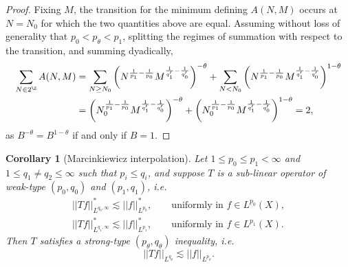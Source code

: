 \documentclass[reqno]{amsart}
\newtheorem{corollary}[theorem]{Corollary}
\theoremstyle{definition}
\theoremstyle{remark}
\begin{document}
\begin{proof}
	Fixing $M$, the transition for the minimum defining $A(N, M)$ occurs at $N = N_0$ for which the two quantities above are equal. Assuming without loss of generality that $p_0 < p_\theta < p_1$, splitting the regimes of summation with respect to the transition, and summing dyadically,
		\begin{align*}
			\sum_{N \in 2^\Z} A(N, M) 
				&= \sum_{N \geq N_0} \left( N^{\frac{1}{p_1} - \frac{1}{p_0}} M^{\frac{1}{q_1'} - \frac{1}{q_0'}} \right)^{-\theta} + \sum_{N < N_0}  \left( N^{\frac{1}{p_1} - \frac{1}{p_0}} M^{\frac{1}{q_1'} - \frac{1}{q_0'}} \right)^{1-\theta} \\
				&=  \left( N_0^{\frac{1}{p_1} - \frac{1}{p_0}} M^{\frac{1}{q_1'} - \frac{1}{q_0'}} \right)^{-\theta} +  \left( N_0^{\frac{1}{p_1} - \frac{1}{p_0}} M^{\frac{1}{q_1'} - \frac{1}{q_0'}} \right)^{1-\theta} = 2,
		\end{align*}	
	as $B^{-\theta} = B^{1 - \theta}$ if and only if $B = 1$. 	
\end{proof}

\begin{corollary}[Marcinkiewicz interpolation]
	Let $1 \leq p_0 \leq p_1 < \infty$ and $1 \leq q_1 \neq q_2 \leq \infty$ such that $p_i \leq q_i$, and suppose $T$ is a sub-linear operator of weak-type $(p_0, q_0)$ and $(p_1, q_1)$, i.e.
		\begin{align*}
			||Tf||_{L^{q_0, \infty}}^* \lesssim ||f||_{L^{p_0}}^*, \qquad \text{uniformly in $f \in L^{p_0}(X)$}, \\
			||Tf||_{L^{q_1, \infty}}^* \lesssim ||f||_{L^{p_1}}^*, \qquad \text{uniformly in $f \in L^{p_1}(X)$}.
		\end{align*}
	Then $T$ satisfies a strong-type $(p_\theta, q_\theta)$ inequality, i.e.
		\[ ||Tf||_{L^{q_\theta}} \lesssim ||f||_{L^{p_\theta}}. \]
\end{corollary}
\end{document}
